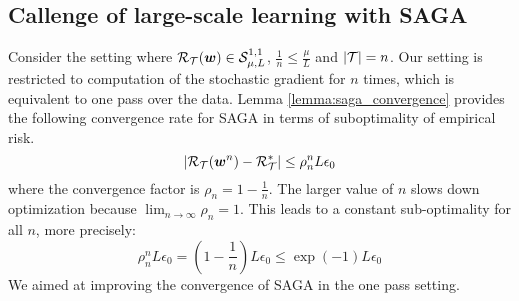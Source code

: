 \subsection{Callenge of large-scale learning with SAGA}
\label{sec:callenge_saga} Consider the setting where ${\cal R}_{{\cal T}}(\bm{w}) \in {\cal S}_{\mu,L}^{1,1}$,
$\frac{1}{n} \leq \frac{\mu}{L}$ and $|{\cal T}| = n$.
Our setting is restricted to computation of the stochastic gradient for
$n$ times, which is equivalent to one pass over the data.
Lemma \ref{lemma:saga_convergence} provides the following convergence rate for
SAGA in terms of suboptimality of empirical risk. 
	\begin{equation*}
		|{\cal R}_{{\cal T}}(\bm{w}^{n}) - {\cal R}_{{\cal T}}^* | \leq \rho_n^{n} L \epsilon_0
	\end{equation*}
where the convergence factor is $\rho_n = 1 - \frac{1}{n}$. The larger value of
$n$ slows down optimization because $ \lim_{n \to \infty} \rho_n	= 1$. This
leads to a constant sub-optimality for all $n$, more precisely: 
\begin{equation*}
	\rho_n^{n} L \epsilon_0 = (1-\frac{1}{n}) L \epsilon_0 \leq \exp(-1) L
	\epsilon_0 
\end{equation*}
We aimed at improving the convergence of SAGA in the one pass setting. 